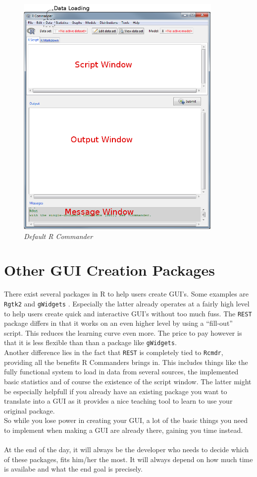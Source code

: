 \documentclass[a4paper]{article}\usepackage[]{graphicx}\usepackage[]{color}
\begin{document}
\begin{figure}[H]
\centering
\includegraphics[width=10cm]{figures/rcmdrwindow.png}
\caption{{\it Default R Commander}\label{rcmdrwindow}}
\end{figure}


\section{Other GUI Creation Packages}
There exist several packages in R to help users create GUI's. Some examples are
\verb|Rgtk2| \citep{Lawrence2014} and \verb|gWidgets| \citep{Verzani2014}.
Especially the latter already operates at a fairly high level to help users
create quick and interactive GUI's without too much fuss. The \verb|REST|
package differs in that it works on an even higher level by using a
``fill-out'' script. This reduces the learning curve even more. The
price to pay however is that it is less flexible than than a package like
\verb|gWidgets|.\\
Another difference lies in the fact that \verb|REST| is completely tied to
\verb|Rcmdr|, providing all the benefits R Commanders brings in. This includes
things like the fully functional system to load in data from several sources,
the implemented basic statistics and of course the existence of the script
window. The latter might be especially helpfull if you already have an existing
package you want to translate into a GUI as it provides a nice teaching tool to
learn to use your original package.\\
So while you lose power in creating your GUI, a lot of the basic things you
need to implement when making a GUI are already there, gaining you time instead.
\\ \\
At the end of the day, it will always be the developer who needs to decide 
which of these packages, fits him/her the most. It will always depend on how much time
is availabe and what the end goal is precisely.
\end{document}
